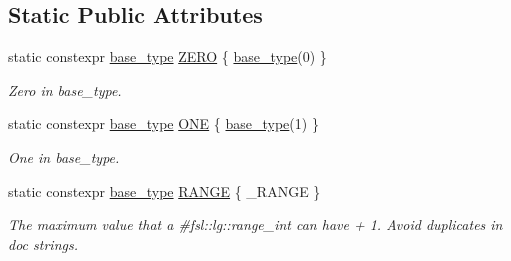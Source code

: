 \subsection*{Static Public Attributes}
\begin{DoxyCompactItemize}
\item 
\mbox{\label{structfsl_1_1ver1__0_1_1lg_1_1range__int_1_1base__type__constants_a58e40f0c294233746edc9e3d60072a0c}} 
static constexpr \mbox{\hyperlink{classfsl_1_1ver1__0_1_1lg_1_1range__int_af14c814b65a761cd387e7577eb2ef78c}{base\+\_\+type}} \mbox{\hyperlink{structfsl_1_1ver1__0_1_1lg_1_1range__int_1_1base__type__constants_a58e40f0c294233746edc9e3d60072a0c}{Z\+E\+RO}} \{ \mbox{\hyperlink{classfsl_1_1ver1__0_1_1lg_1_1range__int_af14c814b65a761cd387e7577eb2ef78c}{base\+\_\+type}}(0) \}
\begin{DoxyCompactList}\small\item\em Zero in base\+\_\+type. \end{DoxyCompactList}\item 
\mbox{\label{structfsl_1_1ver1__0_1_1lg_1_1range__int_1_1base__type__constants_ac05174959dda8113f3cfab01fa75b160}} 
static constexpr \mbox{\hyperlink{classfsl_1_1ver1__0_1_1lg_1_1range__int_af14c814b65a761cd387e7577eb2ef78c}{base\+\_\+type}} \mbox{\hyperlink{structfsl_1_1ver1__0_1_1lg_1_1range__int_1_1base__type__constants_ac05174959dda8113f3cfab01fa75b160}{O\+NE}} \{ \mbox{\hyperlink{classfsl_1_1ver1__0_1_1lg_1_1range__int_af14c814b65a761cd387e7577eb2ef78c}{base\+\_\+type}}(1) \}
\begin{DoxyCompactList}\small\item\em One in base\+\_\+type. \end{DoxyCompactList}\item 
static constexpr \mbox{\hyperlink{classfsl_1_1ver1__0_1_1lg_1_1range__int_af14c814b65a761cd387e7577eb2ef78c}{base\+\_\+type}} \mbox{\hyperlink{structfsl_1_1ver1__0_1_1lg_1_1range__int_1_1base__type__constants_aa4874a10a66da87c8887e56f5da552e3}{R\+A\+N\+GE}} \{ \+\_\+\+R\+A\+N\+GE \}
\begin{DoxyCompactList}\small\item\em The maximum value that a \#fsl\+::lg\+::range\+\_\+int can have + 1. Avoid duplicates in doc strings. \end{DoxyCompactList}\item 

\end{DoxyCompactItemize}
